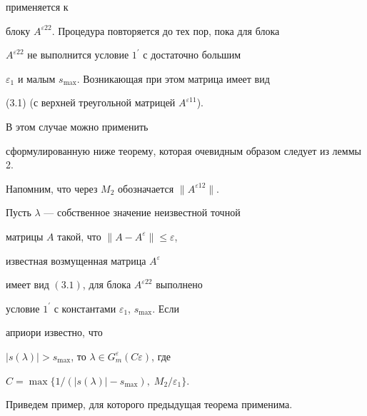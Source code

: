 применяется к


блоку $A^{\varepsilon 22}$. Процедура повторяется до тех пор, пока для блока


$A^{\varepsilon 22}$ не выполнится условие $1^{\prime}$ с достаточно большим


$\varepsilon_1$ и малым $s_{\max}$. Возникающая при этом матрица имеет вид


(3.1) (с верхней треугольной матрицей $A^{\varepsilon 11}$).


В этом случае можно применить


сформулированную ниже теорему, которая очевидным образом следует из леммы 2.


Напомним, что через $M_2$ обозначается $\|A^{\varepsilon 12}\|$.





\begin{thm}


Пусть $\lambda$ --- собственное значение неизвестной точной


матрицы $A$ такой, что $\|A-A^{\varepsilon}\|\le \varepsilon$,


известная возмущенная матрица $A^{\varepsilon}$ 


имеет вид $(3.1)$, для блока $A^{\varepsilon 22}$ выполнено


условие $1^{\prime}$ с константами $\varepsilon_1$, $s_{\max}$. Если


априори известно, что


$|s(\lambda)|>s_{\max}$, то $\lambda\in G^{\varepsilon}_m


(C\varepsilon)$, где


$C=\max\{1/(|s(\lambda)|-s_{\max}),\; M_2/\varepsilon_1\}$.


\end{thm}





Приведем пример, для которого предыдущая теорема применима.





